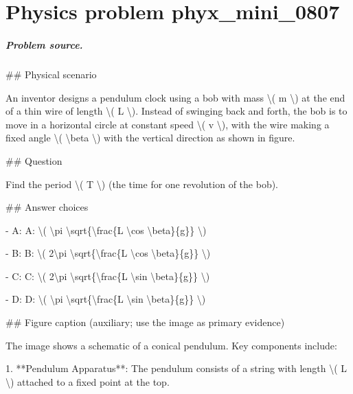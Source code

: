 
\chapter{Physics problem phyx\_mini\_0807}
\label{ch:PhyXMiniProblems_problem_phyx_mini_0807}

\paragraph{Problem source.}
\#\# Physical scenario

An inventor designs a pendulum clock using a bob with mass \textbackslash{}( m \textbackslash{}) at the end of a thin wire of length \textbackslash{}( L \textbackslash{}). Instead of swinging back and forth, the bob is to move in a horizontal circle at constant speed \textbackslash{}( v \textbackslash{}), with the wire making a fixed angle \textbackslash{}( \textbackslash{}beta \textbackslash{}) with the vertical direction as shown in figure.

\#\# Question

Find the period \textbackslash{}( T \textbackslash{}) (the time for one revolution of the bob).

\#\# Answer choices

- A: A: \textbackslash{}( \textbackslash{}pi \textbackslash{}sqrt\{\textbackslash{}frac\{L \textbackslash{}cos \textbackslash{}beta\}\{g\}\} \textbackslash{})

- B: B: \textbackslash{}( 2\textbackslash{}pi \textbackslash{}sqrt\{\textbackslash{}frac\{L \textbackslash{}cos \textbackslash{}beta\}\{g\}\} \textbackslash{})

- C: C: \textbackslash{}( 2\textbackslash{}pi \textbackslash{}sqrt\{\textbackslash{}frac\{L \textbackslash{}sin \textbackslash{}beta\}\{g\}\} \textbackslash{})

- D: D: \textbackslash{}( \textbackslash{}pi \textbackslash{}sqrt\{\textbackslash{}frac\{L \textbackslash{}sin \textbackslash{}beta\}\{g\}\} \textbackslash{})

\#\# Figure caption (auxiliary; use the image as primary evidence)

The image shows a schematic of a conical pendulum. Key components include:

1. **Pendulum Apparatus**: The pendulum consists of a string with length \textbackslash{}( L \textbackslash{}) attached to a fixed point at the top. 

